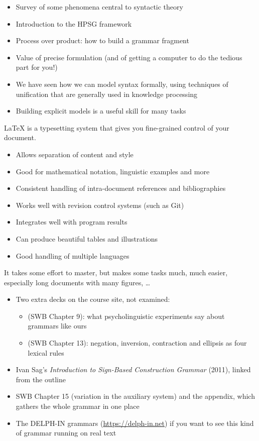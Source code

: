 \documentclass[a4paper,landscape,headrule,footrule]{foils}
\begin{document}

\begin{itemize}
\item Survey of some phenomena central to 
syntactic theory
\item Introduction to the HPSG framework
\item Process over product: how to build a 
grammar fragment
\item Value of precise formulation (and of getting 
a computer to do the tedious part for you!)
\item We have seen how we can model syntax formally, using techniques of unification that are generally used in knowledge processing
\item Building explicit models is a useful skill for many tasks
\end{itemize}


\LaTeX{} is a typesetting system that gives you fine-grained control of your document.

\begin{itemize}\addtolength{\itemsep}{-1ex}
\item Allows separation of content and style
\item Good for mathematical notation, linguistic examples and more
\item Consistent handling of intra-document references and bibliographies
\item Works well with revision control systems (such as Git)
\item Integrates well with program results
\item Can produce beautiful tables and illustrations
\item Good handling of multiple languages
\end{itemize}

It takes some effort to master, but makes some tasks much, much easier, especially long documents with many figures, \ldots


\begin{itemize}
\item Two extra decks on the course site, not examined:
  \begin{itemize}
  \item {} (SWB Chapter 9): what psycholinguistic
    experiments say about grammars like ours
  \item {} (SWB Chapter 13): negation, inversion,
    contraction and ellipsis as four lexical rules
  \end{itemize}
\item Ivan Sag's \textit{Introduction to Sign-Based Construction
    Grammar} (2011), linked from the outline
\item SWB Chapter 15 (variation in the auxiliary system) and the
  appendix, which gathers the whole grammar in one place
\item The DELPH-IN grammars (\url{https://delph-in.net}) if you want
  to see this kind of grammar running on real text
\end{itemize}
\end{document}
